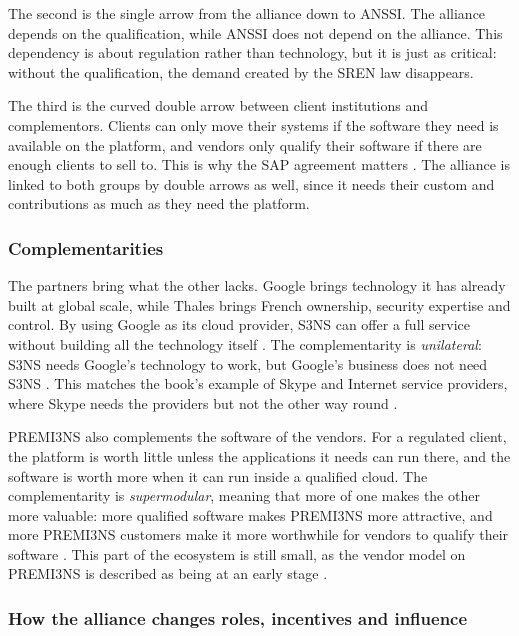 The second is the single arrow from the alliance down to ANSSI. The alliance
depends on the qualification, while ANSSI does not depend on the alliance.
This dependency is about regulation rather than technology, but it is just as
critical: without the qualification, the demand created by the SREN law
disappears.

The third is the curved double arrow between client institutions and
complementors. Clients can only move their systems if the software they need
is available on the platform, and vendors only qualify their software if there
are enough clients to sell to. This is why the SAP agreement matters
\parencite{thalessap2026}. The alliance is linked to both groups by double
arrows as well, since it needs their custom and contributions as much as they
need the platform.

\subsubsection{Complementarities}

The partners bring what the other lacks. Google brings technology it has
already built at global scale, while Thales brings French ownership, security
expertise and control. By using Google as its cloud provider, S3NS can offer a
full service without building all the technology itself
\parencite[p.~54]{overby2021}. The complementarity is \emph{unilateral}: S3NS
needs Google's technology to work, but Google's business does not need S3NS
\parencite[p.~114]{overby2021}. This matches the book's example of Skype and
Internet service providers, where Skype needs the providers but not the other
way round \parencite[p.~115]{overby2021}.

PREMI3NS also complements the software of the vendors. For a regulated client,
the platform is worth little unless the applications it needs can run there,
and the software is worth more when it can run inside a qualified cloud. The
complementarity is \emph{supermodular}, meaning that more of one makes the
other more valuable: more qualified software makes PREMI3NS more attractive,
and more PREMI3NS customers make it more worthwhile for vendors to qualify
their software \parencite[slides~27--28]{windekilde2026ecosystem}. This part of
the ecosystem is still small, as the vendor model on PREMI3NS is described as
being at an early stage \parencite{futurum2026}.

\subsubsection{How the alliance changes roles, incentives and influence}

